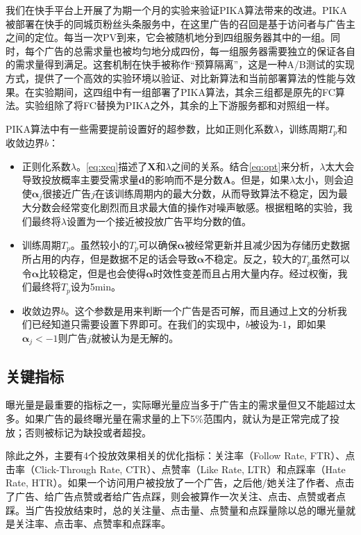 我们在快手平台上开展了为期一个月的实验来验证PIKA算法带来的改进。PIKA被部署在快手的同城页粉丝头条服务中，在这里广告的召回是基于访问者与广告主之间的定位。每当一次PV到来，它会被随机地分到四组服务器其中的一组。同时，每个广告的总需求量也被均匀地分成四份，每一组服务器需要独立的保证各自的需求量得到满足。这套机制在快手被称作“预算隔离”，这是一种A/B测试的实现方式，提供了一个高效的实验环境以验证、对比新算法和当前部署算法的性能与效果。在实验期间，这四组中有一组部署了PIKA算法，其余三组都是原先的FC算法。实验组除了将FC替换为PIKA之外，其余的上下游服务都和对照组一样。

 PIKA算法中有一些需要提前设置好的超参数，比如正则化系数$\lambda$，训练周期$T_p$和收敛边界$b$：
 \begin{itemize}
 	\item 正则化系数$\lambda$。\eqref{eq:xeq}描述了$\bm{X}$和$\lambda$之间的关系。结合\eqref{eq:opt}来分析，$\lambda$太大会导致投放概率主要受需求量$\bm{d}$的影响而不是分数$\bm{A}$。但是，如果$\lambda$太小，则会迫使$\bm{\alpha}_j$很接近广告$j$在该训练周期内的最大分数，从而导致算法不稳定，因为最大分数会经常变化剧烈而且求最大值的操作对噪声敏感。根据粗略的实验，我们最终将$\lambda$设置为一个接近被投放广告平均分数的值。
 	\item 训练周期$T_p$。虽然较小的$T_p$可以确保$\bm{\alpha}$被经常更新并且减少因为存储历史数据所占用的内存，但是数据不足的话会导致$\bm{\alpha}$不稳定。反之，较大的$T_p$虽然可以令$\bm{\alpha}$比较稳定，但是也会使得$\bm{\alpha}$时效性变差而且占用大量内存。经过权衡，我们最终将$T_p$设为5min。
 	\item 收敛边界$b$。这个参数是用来判断一个广告是否可解，而且通过上文的分析我们已经知道只需要设置下界即可。在我们的实现中，$b$被设为-1，即如果$\bm{\alpha}_j<-1$则广告$j$就被认为是无解的。
 \end{itemize}

\subsection{关键指标}

曝光量是最重要的指标之一，实际曝光量应当多于广告主的需求量但又不能超过太多。如果广告的最终曝光量在需求量的上下5\%范围内，就认为是正常完成了投放；否则被标记为缺投或者超投。

除此之外，主要有4个投放效果相关的优化指标：关注率（Follow Rate, FTR）、点击率（Click-Through Rate, CTR）、点赞率（Like Rate, LTR）和点踩率（Hate Rate, HTR）。如果一个访问用户被投放了一个广告，之后他/她关注了作者、点击了广告、给广告点赞或者给广告点踩，则会被算作一次关注、点击、点赞或者点踩。当广告投放结束时，总的关注量、点击量、点赞量和点踩量除以总的曝光量就是关注率、点击率、点赞率和点踩率。

